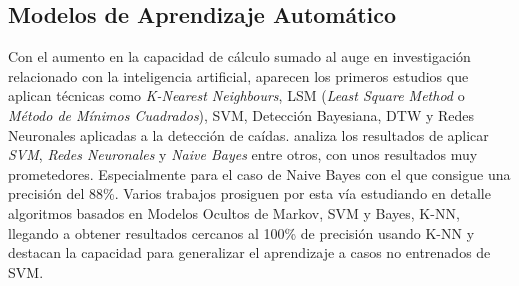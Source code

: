 \begin{comment}

Sobre cálculos basados en cotas, tenemos \cite{fallindex00}, Kangas\cite{Kangas2008} lo compara con el uso ya sea de aceleración vertical o modulo de la aceleración y de nuevo obtiene resultados dispares según el tipo de caída simulada.

\todohide{
1- Monitorizado básico (usar módulo del vector aceleración y un threshold X )
2- Fall Index (Yoshida,  T.;  Mizuno,  F.;  Hayasaka,  T.;  Tsubota,  K.;  Wada,  S.;  Yamaguchi,  T.  A  Wearable  Computer System for a Detection and Prevention of Elderly Users from Falling. In Proceedings of  the  12th  International  Conference  on  Biomedical  and  Medical  Engineering  (ICBME),  Singapore, Singapore, 7–10 December 2005.  )
3- PerFallD (Dai, J.; Bai, X.; Yang, Z.; Shen, Z.; Xuan, D. PerFallD: A Pervasive Fall Detection System using Mobile   Phones.   In   Proceedings   of   the   8th   IEEE   International   Conference   on   Pervasive   Computing  and  Communications  Workshops  (PERCOM  Workshops),  Mannheim,  Germany,    29 March–2 April 2010; pp. 292–297) (usa también un giroscopio)
4- iFall (Sposaro,  F.;  Tyson,  G.  IFall:  An  Android  Application  for  Fall  Monitoring  and  Response.    In Proceedings of the Annual International Conference of the IEEE Engineering in Medicine and Biology Society (EMBC 2009), Minneapolis, MN, USA, 2–6 September 2009; pp. 6119–6122. )}

\end{comment}


\subsection{Modelos de Aprendizaje Automático}\label{sec:arte:modelos_ml}

Con el aumento en la capacidad de cálculo sumado al auge en investigación relacionado con la inteligencia artificial, aparecen los primeros estudios que aplican técnicas como \textit{K-Nearest Neighbours}, LSM (\textit{Least Square Method} o \textit{Método de Mínimos Cuadrados}), SVM, Detección Bayesiana, DTW y Redes Neuronales aplicadas a la detección de caídas.  analiza los resultados de aplicar \textit{SVM}, \textit{Redes Neuronales} y \textit{Naive Bayes} entre otros, con unos resultados muy prometedores. Especialmente para el caso de Naive Bayes con el que consigue una precisión del 88\%. Varios trabajos \cite{Luque2014,ReyesOrtiz2014,tfall,Ozdemir2014} prosiguen por esta vía estudiando en detalle algoritmos basados en Modelos Ocultos de Markov, SVM y Bayes, K-NN, llegando a obtener resultados cercanos al 100\% de precisión usando K-NN \cite{Ozdemir2014} y destacan la capacidad para generalizar el aprendizaje a casos no entrenados de SVM\cite{tfall, Aziz2017b}.


